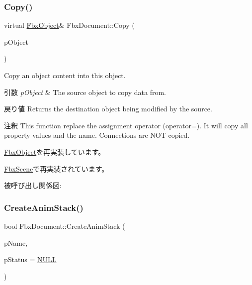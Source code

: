 \mbox{\label{class_fbx_document_a6a345cc64e4ee39a6fd719b56d50dfac}} 
\subsubsection{\texorpdfstring{Copy()}{Copy()}}
{\footnotesize\ttfamily virtual \hyperlink{class_fbx_object}{Fbx\+Object}\& Fbx\+Document\+::\+Copy (\begin{DoxyParamCaption}\item[{const \hyperlink{class_fbx_object}{Fbx\+Object} \&}]{p\+Object }\end{DoxyParamCaption})\hspace{0.3cm}{\ttfamily [virtual]}}

Copy an object content into this object. 
\begin{DoxyParams}{引数}
{\em p\+Object} & The source object to copy data from. \\
\hline
\end{DoxyParams}
\begin{DoxyReturn}{戻り値}
Returns the destination object being modified by the source. 
\end{DoxyReturn}
\begin{DoxyRemark}{注釈}
This function replace the assignment operator (operator=). It will copy all property values and the name. Connections are N\+OT copied. 
\end{DoxyRemark}


\hyperlink{class_fbx_object_a0c0c5adb38284d14bb82c04d54504a3e}{Fbx\+Object}を再実装しています。



\hyperlink{class_fbx_scene_ab78703621f17898a3caf23b589821609}{Fbx\+Scene}で再実装されています。

被呼び出し関係図\+:
\mbox{\label{class_fbx_document_a8180ba3b0b34f301703d77adc912a3a5}} 
\subsubsection{\texorpdfstring{Create\+Anim\+Stack()}{CreateAnimStack()}}
{\footnotesize\ttfamily bool Fbx\+Document\+::\+Create\+Anim\+Stack (\begin{DoxyParamCaption}\item[{const char $\ast$}]{p\+Name,  }\item[{\hyperlink{class_fbx_status}{Fbx\+Status} $\ast$}]{p\+Status = {\ttfamily \hyperlink{fbxarch_8h_a070d2ce7b6bb7e5c05602aa8c308d0c4}{N\+U\+LL}} }\end{DoxyParamCaption})}

